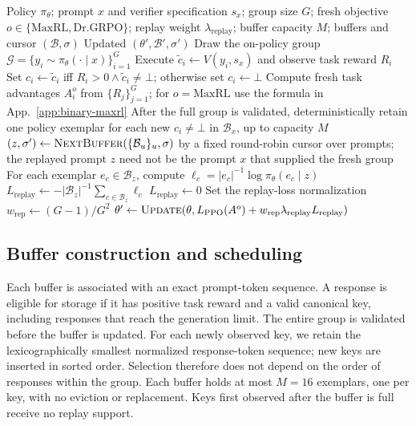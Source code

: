 \begin{algorithm}[H]
  \caption{\textbf{Verified replay update.} The fresh objective selects Re:Dr or Re:Max.}
  \label{alg:verified-replay-update}
  \small
  \begin{algorithmic}[1]
    \REQUIRE Policy $\pi_\theta$; prompt $x$ and verifier specification
      $s_x$; group size $G$; fresh objective
      $o\in\{\mathrm{MaxRL},\mathrm{Dr.GRPO}\}$; replay weight
      $\lambda_{\mathrm{replay}}$; buffer capacity $M$; buffers and cursor
      $(\mathcal B,\sigma)$
    \ENSURE Updated $(\theta',\mathcal B',\sigma')$
    \STATE Draw the on-policy group
      $\mathcal G=\{y_i\sim\pi_\theta(\cdot\mid x)\}_{i=1}^G$
      \STATE Execute $\widetilde c_i\gets V(y_i,s_x)$ and observe task
        reward $R_i$
      \STATE Set $c_i\gets\widetilde c_i$ iff
        $R_i>0\wedge\widetilde c_i\ne\bot$; otherwise set $c_i\gets\bot$
    \ENDFOR
    \STATE Compute fresh task advantages $A_i^{o}$ from $\{R_j\}_{j=1}^G$;
      for $o=\mathrm{MaxRL}$ use the formula in App.~\ref{app:binary-maxrl}
    \STATE After the full group is validated, deterministically retain one
      policy exemplar for each new $c_i\ne\bot$ in $\mathcal B_x$, up to
      capacity $M$
    \STATE $(z,\sigma')\gets\textsc{NextBuffer}
      (\{\mathcal B_u\}_u,\sigma)$ by a fixed round-robin cursor over
      prompts; the replayed prompt $z$ need not be the prompt $x$ that
      supplied the fresh group
      \STATE For each exemplar $e_c\in\mathcal B_z$, compute
        $\ell_c=|e_c|^{-1}\log\pi_\theta(e_c\mid z)$
      \STATE $L_{\mathrm{replay}}\gets-|\mathcal B_z|^{-1}
        \sum_{c\in\mathcal B_z}\ell_c$
    \ELSE
      \STATE $L_{\mathrm{replay}}\gets0$
    \ENDIF
    \STATE Set the replay-loss normalization $w_{\mathrm{rep}}\gets(G-1)/G^2$
    \STATE $\theta'\gets\textsc{Update}
      (\theta,L_{\mathrm{PPO}}(A^{o})
      +w_{\mathrm{rep}}\lambda_{\mathrm{replay}}L_{\mathrm{replay}})$
\end{algorithmic}
\end{algorithm}

\subsection{Buffer construction and scheduling}
\label{app:algorithm-bank}

Each buffer is associated with an exact prompt-token sequence. A response
is eligible for storage if it has positive task reward and a valid canonical
key, including responses that reach the generation limit. The entire group
is validated before the buffer is updated. For each newly observed key, we
retain the lexicographically smallest normalized response-token sequence;
new keys are inserted in sorted order. Selection therefore does not depend
on the order of responses within the group. Each buffer holds at most
$M=16$ exemplars, one per key, with no eviction or replacement. Keys first
observed after the buffer is full receive no replay support.

